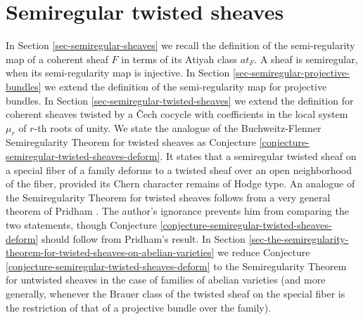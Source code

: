 \documentclass[12pt]{amsart}
\numberwithin{equation}{subsection}
\theoremstyle{plain}
\theoremstyle{definition}
\begin{document}
\section{Semiregular twisted sheaves}
\label{section-semiregular-twisted-sheaves}
In Section \ref{sec-semiregular-sheaves} we recall the definition of the semi-regularity map of a coherent sheaf $F$ in terms of its Atiyah class $at_F$.
A sheaf is semiregular, when its semi-regularity map is injective.
In Section \ref{sec-semiregular-projective-bundles} we extend the definition of the semi-regularity map for projective bundles. In Section \ref{sec-semiregular-twisted-sheaves}
we extend the definition for coherent sheaves twisted by a \v{C}ech cocycle with coefficients in the local system $\mu_r$ of $r$-th roots of unity.
We state the analogue of the Buchweitz-Flenner Semiregularity Theorem for twisted sheaves as Conjecture \ref{conjecture-semiregular-twisted-sheaves-deform}.
It states that a semiregular twisted sheaf on a special fiber of a family deforms to a twisted sheaf over an open neighborhood of the fiber, provided its Chern character remains of Hodge type.
An analogue of the Semiregularity Theorem for twisted sheaves follows from a very general theorem of Pridham \cite[Remark 2.6]{pridham}. The author's ignorance prevents him from comparing the two statements, though Conjecture \ref{conjecture-semiregular-twisted-sheaves-deform} should follow from Pridham's result. In Section \ref{sec-the-semiregularity-theorem-for-twisted-sheaves-on-abelian-varieties} we reduce Conjecture \ref{conjecture-semiregular-twisted-sheaves-deform} to the Semiregularity Theorem for untwisted sheaves in the case of families of abelian varieties (and more generally, whenever the Brauer class of the twisted sheaf on the special fiber is the restriction of that of a projective bundle over the family).
% 
\end{document}
